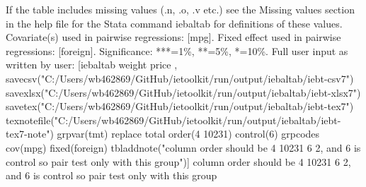 If the table includes missing values (.n, .o, .v etc.) see the Missing values section in the help file for the Stata command iebaltab for definitions of these values. Covariate(s) used in pairwise regressions: [mpg]. Fixed effect used in pairwise regressions: [foreign]. Significance: ***=1\%, **=5\%, *=10\%. Full user input as written by user: [iebaltab weight price , savecsv("C:/Users/wb462869/GitHub/ietoolkit/run/output/iebaltab/iebt-csv7") savexlsx("C:/Users/wb462869/GitHub/ietoolkit/run/output/iebaltab/iebt-xlsx7") savetex("C:/Users/wb462869/GitHub/ietoolkit/run/output/iebaltab/iebt-tex7") texnotefile("C:/Users/wb462869/GitHub/ietoolkit/run/output/iebaltab/iebt-tex7-note") grpvar(tmt) replace total order(4 10231) control(6) grpcodes cov(mpg) fixed(foreign) tbladdnote("column order should be 4 10231 6 2, and 6 is control so pair test only with this group")] column order should be 4 10231 6 2, and 6 is control so pair test only with this group
